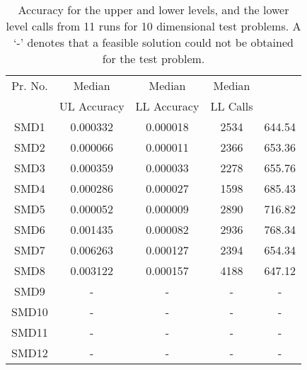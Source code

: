 \documentclass[twoside]{article}
\begin{document}
\begin{table*}[hbt]
\caption{Accuracy for the upper and lower levels, and the lower level calls from 11
  runs for 10 dimensional test problems. A `-' denotes that a feasible solution could not be obtained for the test problem.} 
\label{tab:table2b}
\begin{center}
\begin{tabular}{|c|c|c|c|c|} \hline
Pr. No. & Median & Median & Median &  \\ \cline{2-4}
	& UL Accuracy & LL Accuracy & LL Calls &   \\ \hline
SMD1 & 0.000332 & 0.000018 & 2534 & 644.54	\\	\hline
SMD2 & 0.000066 & 0.000011 & 2366 & 653.36	\\	\hline
SMD3 & 0.000359 & 0.000033 & 2278 & 655.76	\\	\hline
SMD4 & 0.000286 & 0.000027 & 1598 & 685.43	\\	\hline
SMD5 & 0.000052 & 0.000009 & 2890 & 716.82	\\	\hline
SMD6 & 0.001435 & 0.000082 & 2936 & 768.34	\\	\hline
SMD7 & 0.006263 & 0.000127 & 2394 &	654.34\\	\hline
SMD8 & 0.003122 & 0.000157 & 4188 &	647.12\\	\hline
SMD9 & - & - & - & - \\	\hline
SMD10 & - & - & - & - 	\\	\hline
SMD11 & - & - & - & - 	\\	\hline
SMD12 & - & - & - & - 	\\	\hline
\end{tabular}
\end{center}
\end{table*}
\end{document}
